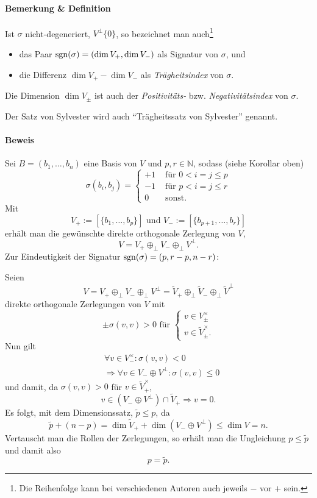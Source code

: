 \paragraph{Bemerkung \& Definition}
\begin{Definition}
	Ist $ \sigma $ nicht-degeneriert, $ V^\perp \{0\} $, so bezeichnet man auch\footnote{Die Reihenfolge kann bei verschiedenen Autoren auch jeweils $ - $ vor $ + $ sein.}
		\begin{itemize}
			\item das Paar $ \operatorname{sgn} (\sigma) =(\dim V_+,\dim V_-)$ als Signatur von $ \sigma $, und
			\item die Differenz $ \dim V_+ - \dim V_- $ als \emph{Trägheitsindex} von $ \sigma $.
		\end{itemize}
	Die Dimension $ \dim V_\pm $ ist auch der \emph{Positivitäts-} bzw. \emph{Negativitätsindex} von $ \sigma $.
\end{Definition}	
	Der Satz von Sylvester wird auch "`Trägheitssatz von Sylvester"' genannt.
\paragraph{Beweis}
	Sei $ B=(b_1,\dots,b_n) $ eine Basis von $ V $ und $ p,r\in \mathbb{N} $, sodass (siehe Korollar oben)
		\[ \sigma(b_i,b_j) =
		\begin{cases}
			+1 & \text{ für } 0 < i=j\leq p\\
			-1 & \text{ für } p < i=j\leq r\\
			0 & \text{ sonst. }
		\end{cases} \]
	Mit
		\[ V_+ := [\{b_1,\dots,b_p \}] \text{ und } V_- := [\{b_{p+1},\dots,b_r\}] \]
	erhält man die gewünschte direkte orthogonale Zerlegung von $ V $,
		\[ V = V_+ \oplus_\perp V_- \oplus_\perp V^\perp. \]
	Zur Eindeutigkeit der Signatur $ \operatorname{sgn}(\sigma) = (p,r-p,n-r) $:
	
	Seien
	\[ V=V_+ \oplus_\perp V_- \oplus_\perp V^\perp
	= \tilde{V}_+\oplus_\perp\tilde{V}_-\oplus_\perp\tilde{V}^\perp \]
	direkte orthogonale Zerlegungen von $ V $ mit
		\[ \pm \sigma(v,v)>0 \text{ für }
			\begin{cases}
				v\in V_\pm^\times\\
				v\in \tilde{V}_\pm^\times.
			\end{cases} \]
	Nun gilt
	\begin{align*}
		&\forall v\in V_-^\times: \sigma(v,v)< 0 \\
		&\Rightarrow \forall v\in V_- \oplus V^\perp: \sigma(v,v) \leq 0
	\end{align*}
	und damit, da $ \sigma(v,v)>0 $ für $ v\in \tilde{V}_+^\times $,
		\[ v\in (V_-\oplus V^\perp)\cap \tilde{V}_+ \Rightarrow v= 0. \]
	Es folgt, mit dem Dimensionssatz, $ \tilde{p}\leq p $, da
		\[ \tilde{p}+(n-p) = \dim \tilde{V}_+ + \dim(V_-\oplus V^\perp) \leq \dim V = n. \]
	Vertauscht man die Rollen der Zerlegungen, so erhält man die Ungleichung $ p\leq \tilde{p} $ und damit also
		\[ p = \tilde{p}. \]
